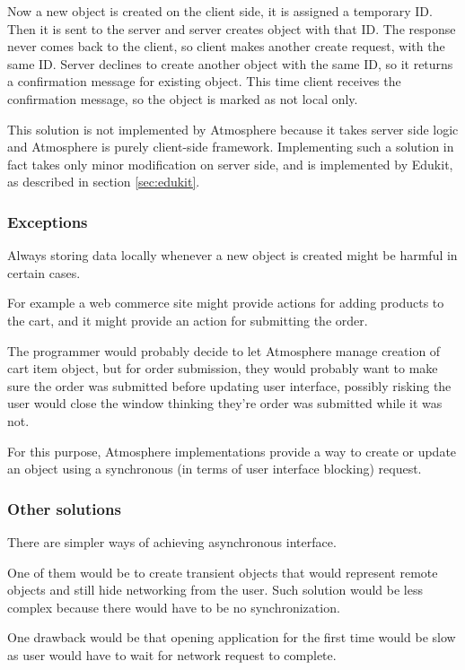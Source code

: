 Now a new object is created on the client side, it is assigned a temporary ID. Then it is sent to the server and server creates object with that ID. The response never comes back to the client, so client makes another create request, with the same ID. Server declines to create another object with the same ID, so it returns a confirmation message for existing object. This time client receives the confirmation message, so the object is marked as not local only.

This solution is not implemented by Atmosphere because it takes server side logic and Atmosphere is purely client-side framework. Implementing such a solution in fact takes only minor modification on server side, and is implemented by Edukit, as described in section \ref{sec:edukit}.

\subsubsection{Exceptions}

Always storing data locally whenever a new object is created might be harmful in certain cases.

For example a web commerce site might provide actions for adding products to the cart, and it might provide an action for submitting the order.

The programmer would probably decide to let Atmosphere manage creation of cart item object, but for order submission, they would probably want to make sure the order was submitted before updating user interface, possibly risking the user would close the window thinking they’re order was submitted while it was not.

For this purpose, Atmosphere implementations provide a way to create or update an object using a synchronous (in terms of user interface blocking) request. 

\subsubsection{Other solutions}

There are simpler ways of achieving asynchronous interface.

One of them would be to create transient objects that would represent remote objects and still hide networking from the user. Such solution would be less complex because there would have to be no synchronization.

 One drawback would be that opening application for the first time would be slow as user would have to wait for network request to complete. 

